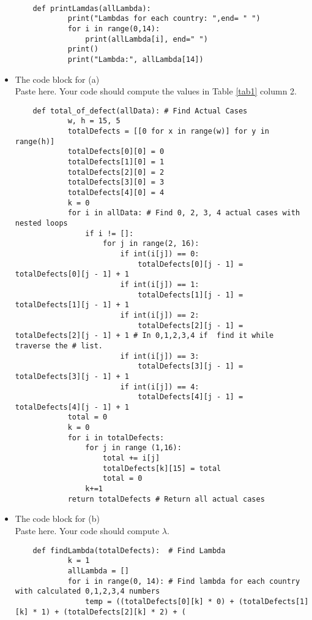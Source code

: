 \documentclass[a4 paper]{article}
\numberwithin{equation}{section}
\newcommand{\0}{\mathbf{0}}
\begin{document}
\begin{itemize}
\begin{lstlisting}
        
    def printLamdas(allLambda):
            print("Lambdas for each country: ",end= " ")
            for i in range(0,14):
                print(allLambda[i], end=" ")
            print()
            print("Lambda:", allLambda[14])
        \end{lstlisting}
		\item The code block for (a)\\
		Paste here. Your code should compute the values in Table \ref{tab1} column 2.
		\begin{lstlisting}
	def total_of_defect(allData): # Find Actual Cases
            w, h = 15, 5
            totalDefects = [[0 for x in range(w)] for y in range(h)]
            totalDefects[0][0] = 0
            totalDefects[1][0] = 1
            totalDefects[2][0] = 2
            totalDefects[3][0] = 3
            totalDefects[4][0] = 4
            k = 0
            for i in allData: # Find 0, 2, 3, 4 actual cases with nested loops
                if i != []:
                    for j in range(2, 16):
                        if int(i[j]) == 0:
                            totalDefects[0][j - 1] = totalDefects[0][j - 1] + 1
                        if int(i[j]) == 1:
                            totalDefects[1][j - 1] = totalDefects[1][j - 1] + 1
                        if int(i[j]) == 2:
                            totalDefects[2][j - 1] = totalDefects[2][j - 1] + 1 # In 0,1,2,3,4 if  find it while traverse the # list.
                        if int(i[j]) == 3:
                            totalDefects[3][j - 1] = totalDefects[3][j - 1] + 1
                        if int(i[j]) == 4:
                            totalDefects[4][j - 1] = totalDefects[4][j - 1] + 1
            total = 0
            k = 0
            for i in totalDefects:
                for j in range (1,16):
                    total += i[j]
                    totalDefects[k][15] = total
                    total = 0
                k+=1
            return totalDefects # Return all actual cases
		\end{lstlisting}
		\item The code block for (b)\\
		Paste here. Your code should compute $\lambda$.
		\begin{lstlisting}
    def findLambda(totalDefects):  # Find Lambda
            k = 1
            allLambda = []
            for i in range(0, 14): # Find lambda for each country with calculated 0,1,2,3,4 numbers
                temp = ((totalDefects[0][k] * 0) + (totalDefects[1][k] * 1) + (totalDefects[2][k] * 2) + (

\end{lstlisting}
\end{itemize}
\end{document}
